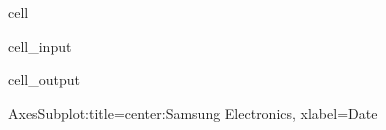 \documentclass[letterpaper,10pt,english]{jupyterBook}
\begin{document}
\begin{sphinxuseclass}{cell}\begin{sphinxVerbatimInput}

\begin{sphinxuseclass}{cell_input}
\begin{sphinxVerbatim}[commandchars=\\\{\}]
\PYG{p}{[}\PYG{p}{]}   
\end{sphinxVerbatim}

\end{sphinxuseclass}\end{sphinxVerbatimInput}
\begin{sphinxVerbatimOutput}

\begin{sphinxuseclass}{cell_output}
\begin{sphinxVerbatim}[commandchars=\\\{\}]
\PYGZlt{}AxesSubplot:title=\PYGZob{}\PYGZsq{}center\PYGZsq{}:\PYGZsq{}Samsung Electronics\PYGZsq{}\PYGZcb{}, xlabel=\PYGZsq{}Date\PYGZsq{}\PYGZgt{}
\end{sphinxVerbatim}

\noindent{}

\end{sphinxuseclass}\end{sphinxVerbatimOutput}

\end{sphinxuseclass}
\end{document}
